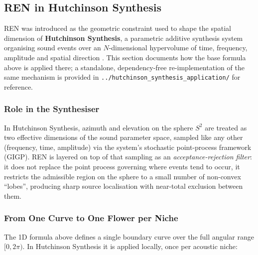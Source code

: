 \documentclass[11pt,a4paper]{article}
\begin{document}
\subsection{REN in Hutchinson Synthesis}
\label{sec:hutchinson}

REN was introduced as the geometric constraint used to shape the spatial
dimension of \textbf{Hutchinson Synthesis}, a parametric additive synthesis
system organising sound events over an $N$-dimensional hypervolume of time,
frequency, amplitude and spatial direction \cite{hutchinsonrepo2026}.
This section documents how the base formula above is applied there; a
standalone, dependency-free re-implementation of the same mechanism is
provided in \texttt{../hutchinson\_synthesis\_application/} for reference.

\subsubsection{Role in the Synthesiser}

In Hutchinson Synthesis, azimuth and elevation on the sphere $S^2$ are
treated as two effective dimensions of the sound parameter space, sampled
like any other (frequency, time, amplitude) via the system's stochastic
point-process framework (GIGP). REN is layered on top of that sampling as
an \emph{acceptance-rejection filter}: it does not replace the point
process governing where events tend to occur, it restricts the admissible
region on the sphere to a small number of non-convex ``lobes'', producing
sharp source localisation with near-total exclusion between them.

\subsubsection{From One Curve to One Flower per Niche}

The 1D formula above defines a single boundary curve over the full
angular range $[0, 2\pi)$. In Hutchinson Synthesis it is applied locally,
once per acoustic niche:
\end{document}
